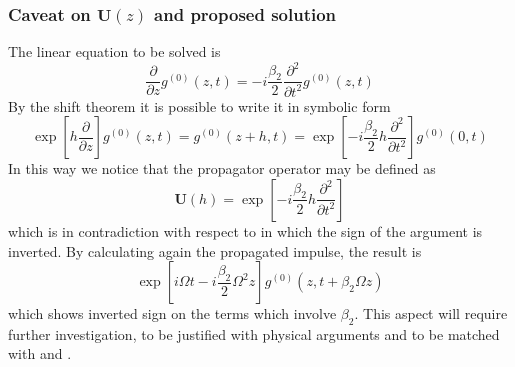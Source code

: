 \documentclass[8pt]{beamer} %
\begin{document}
\begin{frame}
	\frametitle{Caveat on $\mathbf{U}(z)$ and proposed solution}
	The linear equation to be solved is 
	\begin{equation}
		\frac{\partial}{\partial z} g^{(0)}(z, t) = - i \frac{\beta_2}{2}\frac{\partial^2}{\partial t^2} g^{(0)}(z, t)
	\end{equation}
	By the shift theorem \cite{Wiener_1926} it is possible to write it in symbolic form
	\begin{equation}
		\exp\left[h \frac{\partial}{\partial z}\right] g^{(0)}(z, t) = g^{(0)}(z+h, t) = \exp\left[- i \frac{\beta_2}{2}h\frac{\partial^2}{\partial t^2} \right]  g^{(0)}(0, t)
	\end{equation}
	In this way we notice that the propagator operator may be defined as
	\begin{equation}
		\mathbf{U}(h) = \exp\left[- i \frac{\beta_2}{2}h\frac{\partial^2}{\partial t^2} \right]
	\end{equation}
	which is in contradiction with respect to \cite{Dar_2013} in which the sign of the argument is inverted.
	By calculating again the propagated impulse, the result is
	\begin{equation}
		\exp \left[i\Omega t -i \frac{\beta_2}{2}\Omega^2 z \right] g^{(0)}(z, t + \beta_2\Omega z)
	\end{equation} 
	which shows inverted sign on the terms which involve $\beta_2$.
	This aspect will require further investigation, to be justified with physical arguments and to be matched with \cite{Dar_2013} and \cite[eq. 23]{Mecozzi_2012}.
\end{frame}
\end{document}
